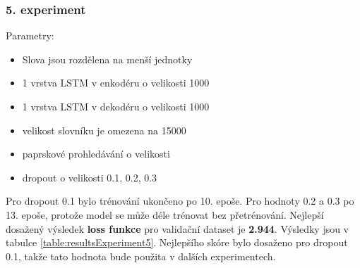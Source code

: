 \subsubsection{5. experiment}\label{experiment5}
Parametry:
\begin{itemize}
  \item Slova jsou rozdělena na menší jednotky
  \item 1 vrstva LSTM v enkodéru o velikosti 1000
  \item 1 vrstva LSTM v dekodéru o velikosti 1000
  \item velikost slovníku je omezena na 15000
  \item paprskové prohledávání o velikosti
  \item dropout o velikosti 0.1, 0.2, 0.3
\end{itemize}

 Pro dropout 0.1 bylo trénování ukončeno po 10. epoše. Pro hodnoty 0.2 a 0.3 po 13. epoše, protože model se může déle trénovat bez přetrénování. Nejlepší dosažený výsledek \textbf{loss funkce} pro validační dataset je \textbf{2.944}. Výsledky jsou v tabulce \ref{table:resultsExperiment5}. Nejlepšího skóre bylo dosaženo pro dropout 0.1, takže tato hodnota bude použita v dalších experimentech.

